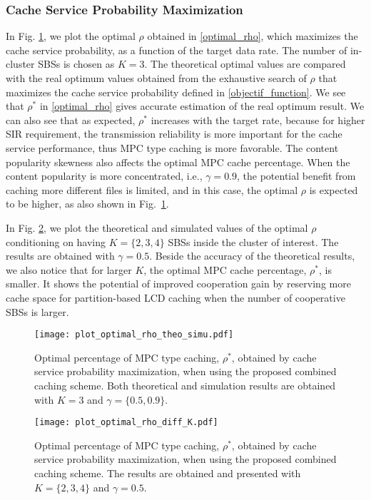 \documentclass[twocolumns,10pt]{IEEEtran}
\begin{document}
\subsubsection{Cache Service Probability Maximization}
In Fig. \ref{optimal_rho_vs_rate}, we plot the optimal $\rho$ obtained in \eqref{optimal_rho}, which maximizes the cache service probability, as a function of the target data rate. The number of in-cluster SBSs is chosen as $K=3$. 
The theoretical optimal values are compared with the real optimum values obtained from the exhaustive search of $\rho$ that maximizes the cache service probability defined in \eqref{objectif_function}. 
We see that $\rho^{*}$ in \eqref{optimal_rho} gives accurate estimation of the real optimum result. We can also see that as expected, $\rho^{*}$ increases with the target rate, because for higher SIR requirement, the transmission reliability is more important for the cache service performance, thus MPC type caching is more favorable. 
The content popularity skewness also affects the optimal MPC cache percentage. When the content popularity is more concentrated, i.e., $\gamma=0.9$, the potential benefit from caching more different files is limited, and in this case, the optimal $\rho$ is expected to be higher, as also shown in Fig.~\ref{optimal_rho_vs_rate}.

In Fig. \ref{optimal_rho_diff_K}, we plot the theoretical and simulated values of the optimal  $\rho$ conditioning on having $K=\{2, 3, 4\}$ SBSs inside the cluster of interest. The results are obtained with $\gamma=0.5$. Beside the accuracy of the theoretical results, we also notice that for larger $K$, the optimal MPC cache percentage, $\rho^{*}$, is smaller. It shows the potential of improved cooperation gain by reserving more cache space for partition-based LCD caching when the number of cooperative SBSs is larger. 


\begin{figure}
	\centering
	\texttt{[image: plot\_optimal\_rho\_theo\_simu.pdf]}
	\caption{Optimal percentage of MPC type caching, $\rho^{*}$, obtained by cache service probability maximization, when using the proposed combined caching scheme. Both theoretical and simulation results are obtained with $K=3$ and $\gamma=\{0.5, 0.9\}$.}
	\label{optimal_rho_vs_rate}
\end{figure}

\begin{figure}
	\centering
	\texttt{[image: plot\_optimal\_rho\_diff\_K.pdf]}
	\caption{Optimal percentage of MPC type caching, $\rho^{*}$, obtained by cache service probability maximization, when using the proposed combined caching scheme. The results are obtained and presented with $K=\{2,3,4\}$ and $\gamma=0.5$.}
	\label{optimal_rho_diff_K}
\end{figure}
\end{document}
